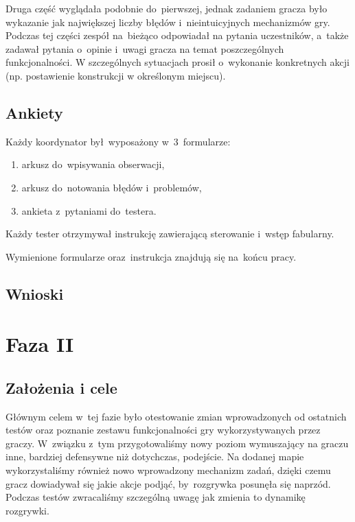 \documentclass[licencjacka]{pracamgr}
\begin{document}
      Druga część wyglądała podobnie do~pierwszej, jednak zadaniem gracza było wykazanie 
      jak największej liczby błędów i~nieintuicyjnych mechanizmów gry. 
      Podczas tej części zespół na~bieżąco odpowiadał na pytania uczestników,
      a~także zadawał pytania o~opinie i~uwagi gracza na temat poszczególnych funkcjonalności.
      W szczególnych sytuacjach prosił o~wykonanie konkretnych akcji (np. postawienie konstrukcji w określonym miejscu).

      \subsection{Ankiety}
      Każdy koordynator był~wyposażony w~3~formularze:
      \begin{enumerate}
	\item arkusz do~wpisywania obserwacji,
	\item arkusz do~notowania błędów i~problemów,
	\item ankieta z~pytaniami do~testera.
      \end{enumerate}
      Każdy tester otrzymywał instrukcję zawierającą sterowanie i~wstęp fabularny.

      \noindent
      Wymienione formularze oraz~instrukcja znajdują się na~końcu pracy.
      
      \subsection{Wnioski}

    \section{Faza II}
    
      \subsection{Założenia i cele}
      Głównym celem w~tej fazie było otestowanie zmian wprowadzonych od ostatnich testów oraz poznanie zestawu funkcjonalności gry
      wykorzystywanych przez graczy. W~związku z~tym przygotowaliśmy nowy poziom wymuszający na graczu inne, bardziej defensywne
      niż dotychczas, podejście. Na dodanej mapie wykorzystaliśmy również nowo wprowadzony mechanizm zadań, dzięki czemu gracz 
      dowiadywał się jakie akcje podjąć, by~rozgrywka posunęła się naprzód. Podczas testów zwracaliśmy szczególną uwagę jak zmienia
      to dynamikę rozgrywki.
\end{document}
